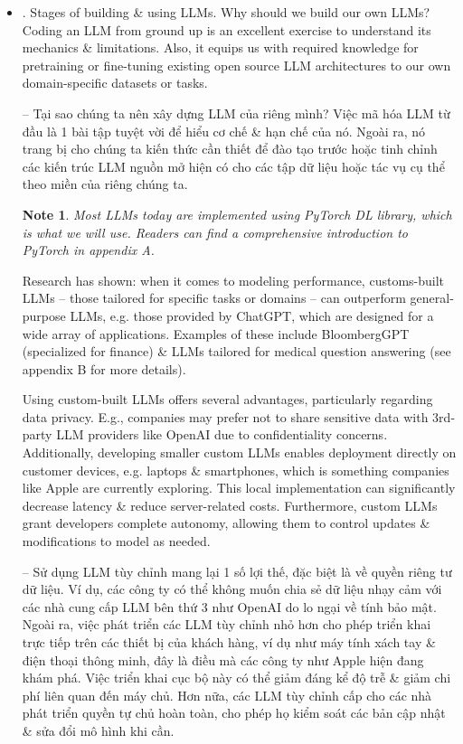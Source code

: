 \documentclass{article}
\newtheorem{note}{Note}
\begin{document}
\begin{itemize}
\begin{itemize}
		Will focus on understanding how LLMs work from ground up, coding an LLM that can generate texts. Will also learn about techniques that allow LLMs to carry out queries, ranging from answering questions to summarizing text, translating text into different languages, \& more. I.e., will learn how complex LLM assistants e.g. ChatGPT work by building 1 step by step.
		\item {. Stages of building \& using LLMs.} Why should we build our own LLMs? Coding an LLM from ground up is an excellent exercise to understand its mechanics \& limitations. Also, it equips us with required knowledge for pretraining or fine-tuning existing open source LLM architectures to our own domain-specific datasets or tasks.
		
		-- Tại sao chúng ta nên xây dựng LLM của riêng mình? Việc mã hóa LLM từ đầu là 1  bài tập tuyệt vời để hiểu cơ chế \& hạn chế của nó. Ngoài ra, nó trang bị cho chúng ta kiến thức cần thiết để đào tạo trước hoặc tinh chỉnh các kiến trúc LLM nguồn mở hiện có cho các tập dữ liệu hoặc tác vụ cụ thể theo miền của riêng chúng ta.
		\begin{note}
			Most LLMs today are implemented using PyTorch DL library, which is what we will use. Readers can find a comprehensive introduction to PyTorch in appendix A.
		\end{note}
		Research has shown: when it comes to modeling performance, customs-built LLMs -- those tailored for specific tasks or domains -- can outperform general-purpose LLMs, e.g. those provided by ChatGPT, which are designed for a wide array of applications. Examples of these include BloombergGPT (specialized for finance) \& LLMs tailored for medical question answering (see appendix B for more details).
		
		Using custom-built LLMs offers several advantages, particularly regarding data privacy. E.g., companies may prefer not to share sensitive data with 3rd-party LLM providers like OpenAI due to confidentiality concerns. Additionally, developing smaller custom LLMs enables deployment directly on customer devices, e.g. laptops \& smartphones, which is something companies like Apple are currently exploring. This local implementation can significantly decrease latency \& reduce server-related costs. Furthermore, custom LLMs grant developers complete autonomy, allowing them to control updates \& modifications to model as needed.
		
		-- Sử dụng LLM tùy chỉnh mang lại 1  số lợi thế, đặc biệt là về quyền riêng tư dữ liệu. Ví dụ, các công ty có thể không muốn chia sẻ dữ liệu nhạy cảm với các nhà cung cấp LLM bên thứ 3 như OpenAI do lo ngại về tính bảo mật. Ngoài ra, việc phát triển các LLM tùy chỉnh nhỏ hơn cho phép triển khai trực tiếp trên các thiết bị của khách hàng, ví dụ như máy tính xách tay \& điện thoại thông minh, đây là điều mà các công ty như Apple hiện đang khám phá. Việc triển khai cục bộ này có thể giảm đáng kể độ trễ \& giảm chi phí liên quan đến máy chủ. Hơn nữa, các LLM tùy chỉnh cấp cho các nhà phát triển quyền tự chủ hoàn toàn, cho phép họ kiểm soát các bản cập nhật \& sửa đổi mô hình khi cần.
		

\end{itemize}
\end{itemize}
\end{document}
